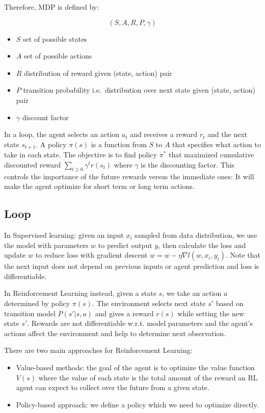\documentclass[11pt]{article}
\begin{document}
Therefore, MDP is defined by:

\[(S, A, R, P, \gamma)\]

\begin{itemize}
\tightlist
\item
  \(S\) set of possible states
\item
  \(A\) set of possible actions
\item
  \(R\) distribution of reward given (state, action) pair
\item
  \(P\) transition probability i.e.~distribution over next state given
  (state, action) pair
\item
  \(\gamma\) discount factor
\end{itemize}

In a loop, the agent selects an action \(a_t\) and receives a reward
\(r_t\) and the next state \(s_{t+1}\). A policy \(\pi(s)\) is a
function from \(S\) to \(A\) that specifies what action to take in each
state. The objective is to find policy \(\pi^*\) that maximized
cumulative discounted reward \(\sum_{t\ge 0}\gamma^t r(s_t)\) where
\(\gamma\) is the discounting factor. This controls the importance of
the future rewards versus the immediate ones: It will make the agent
optimize for short term or long term actions.

\subsection{Loop}\label{loop}

In Supervised learning: given an input \(x_i\) sampled from data
distribution, we use the model with parameters \(w\) to predict output
\(y\), then calculate the loss and update \(w\) to reduce loss with
gradient descent \(w = w-\eta \nabla l(w, x_i, y_i)\). Note that the
next input does not depend on previous inputs or agent prediction and
loss is differentiable.

In Reinforcement Learning instead, given a state \(s\), we take an
action \(a\) determined by policy \(\pi(s)\). The environment selects
next state \(s'\) based on transition model \(P(s'|s, a)\) and gives a
reward \(r(s)\) while setting the new state \(s'\). Rewards are not
differentiable w.r.t. model parameters and the agent's actions affect
the environment and help to determine next observation.

There are two main approaches for Reinforcement Learning:

\begin{itemize}
\tightlist
\item
  Value-based methods: the goal of the agent is to optimize the value
  function \(V(s)\) where the value of each state is the total amount of
  the reward an RL agent can expect to collect over the future from a
  given state.
\item
  Policy-based approach: we define a policy which we need to optimize
  directly.
\end{itemize}
\end{document}
